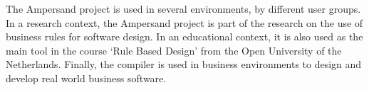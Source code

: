 The Ampersand project is used in several environments, by different user groups.
In a research context, the Ampersand project is part of the research on the use of business rules for software design.
In an educational context, it is also used as the main tool in the course `Rule Based Design' from the Open University of the Netherlands.
Finally, the compiler is used in business environments to design and develop real world business software.
